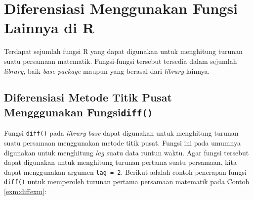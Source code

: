 \documentclass[]{book}
\newenvironment{Shaded}{\begin{snugshade}}{\end{snugshade}}
\newcommand{\CommentTok}[1]{\textcolor[rgb]{0.56,0.35,0.01}{\textit{#1}}}
\newcommand{\ControlFlowTok}[1]{\textcolor[rgb]{0.13,0.29,0.53}{\textbf{#1}}}
\newcommand{\DataTypeTok}[1]{\textcolor[rgb]{0.13,0.29,0.53}{#1}}
\newcommand{\DecValTok}[1]{\textcolor[rgb]{0.00,0.00,0.81}{#1}}
\newcommand{\KeywordTok}[1]{\textcolor[rgb]{0.13,0.29,0.53}{\textbf{#1}}}
\newcommand{\NormalTok}[1]{#1}
\newcommand{\OperatorTok}[1]{\textcolor[rgb]{0.81,0.36,0.00}{\textbf{#1}}}
\newcommand{\StringTok}[1]{\textcolor[rgb]{0.31,0.60,0.02}{#1}}
\theoremstyle{definition}
\theoremstyle{definition}
\theoremstyle{definition}
\theoremstyle{remark}
\begin{document}
\hypertarget{diffother}{%
\section{Diferensiasi Menggunakan Fungsi Lainnya di R}\label{diffother}}

Terdapat sejumlah fungsi R yang dapat digunakan untuk menghitung turunan suatu persamaan matematik. Fungsi-fungsi tersebut tersedia dalam sejumlah \emph{library}, baik \emph{base package} maupun yang berasal dari \emph{library} lainnya.

\hypertarget{diferensiasi-metode-titik-pusat-mengggunakan-fungsidiff}{%
\subsection{\texorpdfstring{Diferensiasi Metode Titik Pusat Mengggunakan Fungsi\texttt{diff()}}{Diferensiasi Metode Titik Pusat Mengggunakan Fungsidiff()}}\label{diferensiasi-metode-titik-pusat-mengggunakan-fungsidiff}}

Fungsi \texttt{diff()} pada \emph{library} \emph{base} dapat digunakan untuk menghitung turunan suatu persamaan menggunakan metode titik pusat. Fungsi ini pada umumnya digunakan untuk menghitung \emph{lag} suatu data runtun waktu. Agar fungsi tersebut dapat digunakan untuk menghitung turunan pertama suatu persamaan, kita dapat menggunakan argumen \texttt{lag\ =\ 2}. Berikut adalah contoh penerapan fungsi \texttt{diff()} untuk memperoleh turunan pertama persamaan matematik pada Contoh \ref{exm:diffexm}:

\begin{Shaded}
\end{Shaded}
\end{document}

